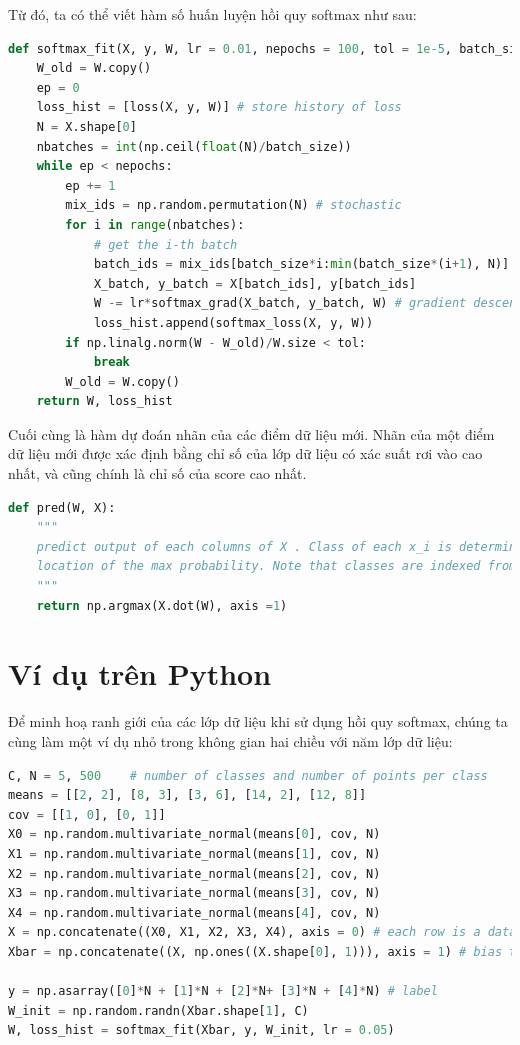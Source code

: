 Từ đó, ta có thể viết hàm số huấn luyện hồi quy softmax như sau:
\begin{lstlisting}[language=Python]
def softmax_fit(X, y, W, lr = 0.01, nepochs = 100, tol = 1e-5, batch_size = 10):
    W_old = W.copy()
    ep = 0
    loss_hist = [loss(X, y, W)] # store history of loss
    N = X.shape[0]
    nbatches = int(np.ceil(float(N)/batch_size))
    while ep < nepochs:
        ep += 1
        mix_ids = np.random.permutation(N) # stochastic
        for i in range(nbatches):
            # get the i-th batch
            batch_ids = mix_ids[batch_size*i:min(batch_size*(i+1), N)]
            X_batch, y_batch = X[batch_ids], y[batch_ids]
            W -= lr*softmax_grad(X_batch, y_batch, W) # gradient descent
            loss_hist.append(softmax_loss(X, y, W))
        if np.linalg.norm(W - W_old)/W.size < tol:
            break
        W_old = W.copy()
    return W, loss_hist
\end{lstlisting}
Cuối cùng là hàm dự đoán nhãn của các điểm dữ liệu mới. Nhãn của một điểm dữ
liệu mới được xác định bằng chỉ số của lớp dữ liệu có xác suất rơi vào cao nhất,
và cũng chính là chỉ số của score cao nhất.
\begin{lstlisting}[language=Python]
def pred(W, X):
    """
    predict output of each columns of X . Class of each x_i is determined by
    location of the max probability. Note that classes are indexed from 0.
    """
    return np.argmax(X.dot(W), axis =1)
\end{lstlisting}

\section{Ví dụ trên Python}
Để minh hoạ ranh giới của các lớp dữ liệu khi sử dụng hồi quy softmax, chúng
ta cùng làm một ví dụ nhỏ trong không gian hai chiều với năm lớp dữ liệu:
\begin{lstlisting}[language=Python]
C, N = 5, 500    # number of classes and number of points per class
means = [[2, 2], [8, 3], [3, 6], [14, 2], [12, 8]]
cov = [[1, 0], [0, 1]]
X0 = np.random.multivariate_normal(means[0], cov, N)
X1 = np.random.multivariate_normal(means[1], cov, N)
X2 = np.random.multivariate_normal(means[2], cov, N)
X3 = np.random.multivariate_normal(means[3], cov, N)
X4 = np.random.multivariate_normal(means[4], cov, N)
X = np.concatenate((X0, X1, X2, X3, X4), axis = 0) # each row is a datapoint
Xbar = np.concatenate((X, np.ones((X.shape[0], 1))), axis = 1) # bias trick

y = np.asarray([0]*N + [1]*N + [2]*N+ [3]*N + [4]*N) # label
W_init = np.random.randn(Xbar.shape[1], C)
W, loss_hist = softmax_fit(Xbar, y, W_init, lr = 0.05)
\end{lstlisting}


